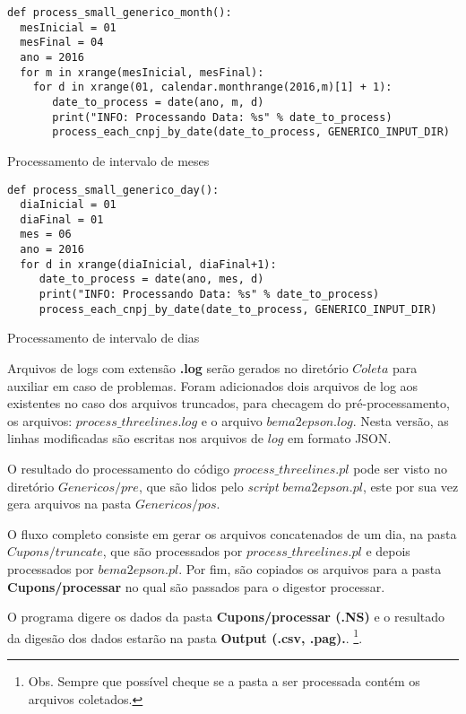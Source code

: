\documentclass{article}      %
\begin{document}
\begin{listing}[H]
\begin{verbatim}
def process_small_generico_month():
  mesInicial = 01
  mesFinal = 04
  ano = 2016
  for m in xrange(mesInicial, mesFinal):
    for d in xrange(01, calendar.monthrange(2016,m)[1] + 1):
       date_to_process = date(ano, m, d)
       print("INFO: Processando Data: %s" % date_to_process)
       process_each_cnpj_by_date(date_to_process, GENERICO_INPUT_DIR)
\end{verbatim}
\caption{Processamento de intervalo de meses}
\label{code:meses}
\end{listing}


\begin{listing}[H]
\begin{verbatim}
def process_small_generico_day():
  diaInicial = 01
  diaFinal = 01
  mes = 06
  ano = 2016
  for d in xrange(diaInicial, diaFinal+1):
     date_to_process = date(ano, mes, d)
     print("INFO: Processando Data: %s" % date_to_process)
     process_each_cnpj_by_date(date_to_process, GENERICO_INPUT_DIR)
\end{verbatim}
\caption{Processamento de intervalo de dias}
\label{code:dias}
\end{listing}


Arquivos de logs com extensão \textbf{.log} serão gerados no diretório $Coleta$ para auxiliar em caso de problemas. Foram adicionados dois arquivos de log aos existentes no caso dos arquivos truncados, para checagem do pré-processamento, os arquivos: $process\_threelines.log$ e o arquivo $bema2epson.log$. Nesta versão, as linhas modificadas são escritas nos arquivos de $log$ em formato JSON. 

O resultado do processamento do código $process\_threelines.pl$ pode ser visto no diretório $Genericos/pre$, que são lidos pelo \emph{script} $bema2epson.pl$, este por sua vez gera arquivos na pasta $Genericos/pos$. 

O fluxo completo consiste em gerar os arquivos concatenados de um dia, na pasta $Cupons/truncate$, que são processados por $process\_threelines.pl$ e depois processados por $bema2epson.pl$. Por fim, são copiados os arquivos para a pasta \textbf{Cupons/processar} no qual são passados para o digestor processar. 

O programa digere os dados da pasta \textbf{Cupons/processar (.NS)} e o resultado da digesão dos dados estarão na pasta \textbf{Output (.csv, .pag).}.  \footnote{Obs. Sempre que possível cheque se a pasta a ser processada contém os arquivos coletados.}.
\end{document}
